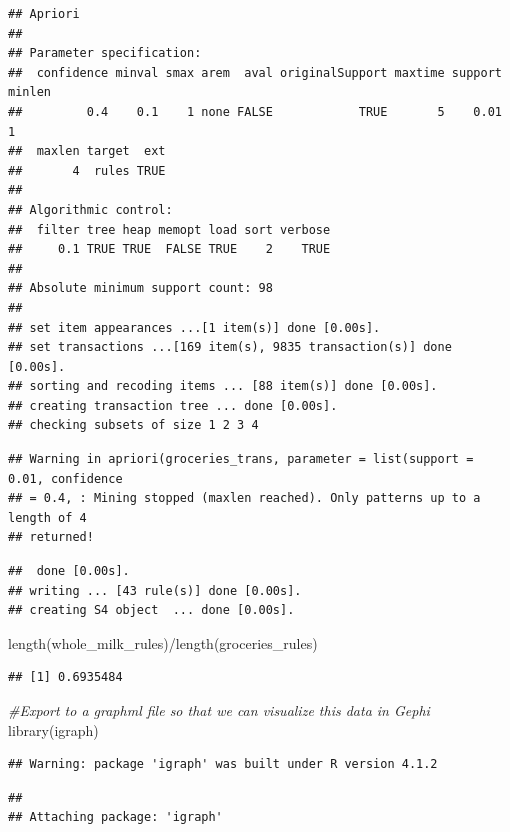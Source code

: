 \documentclass[
]{article}
\newenvironment{Shaded}{\begin{snugshade}}{\end{snugshade}}
\newcommand{\CommentTok}[1]{\textcolor[rgb]{0.56,0.35,0.01}{\textit{#1}}}
\newcommand{\FunctionTok}[1]{\textcolor[rgb]{0.00,0.00,0.00}{#1}}
\newcommand{\NormalTok}[1]{#1}
\newcommand{\SpecialCharTok}[1]{\textcolor[rgb]{0.00,0.00,0.00}{#1}}
\begin{document}
\begin{verbatim}
## Apriori
## 
## Parameter specification:
##  confidence minval smax arem  aval originalSupport maxtime support minlen
##         0.4    0.1    1 none FALSE            TRUE       5    0.01      1
##  maxlen target  ext
##       4  rules TRUE
## 
## Algorithmic control:
##  filter tree heap memopt load sort verbose
##     0.1 TRUE TRUE  FALSE TRUE    2    TRUE
## 
## Absolute minimum support count: 98 
## 
## set item appearances ...[1 item(s)] done [0.00s].
## set transactions ...[169 item(s), 9835 transaction(s)] done [0.00s].
## sorting and recoding items ... [88 item(s)] done [0.00s].
## creating transaction tree ... done [0.00s].
## checking subsets of size 1 2 3 4
\end{verbatim}

\begin{verbatim}
## Warning in apriori(groceries_trans, parameter = list(support = 0.01, confidence
## = 0.4, : Mining stopped (maxlen reached). Only patterns up to a length of 4
## returned!
\end{verbatim}

\begin{verbatim}
##  done [0.00s].
## writing ... [43 rule(s)] done [0.00s].
## creating S4 object  ... done [0.00s].
\end{verbatim}

\begin{Shaded}
\begin{Highlighting}[]
\FunctionTok{length}\NormalTok{(whole\_milk\_rules)}\SpecialCharTok{/}\FunctionTok{length}\NormalTok{(groceries\_rules)}
\end{Highlighting}
\end{Shaded}

\begin{verbatim}
## [1] 0.6935484
\end{verbatim}

\begin{Shaded}
\begin{Highlighting}[]
\CommentTok{\#Export to a graphml file so that we can visualize this data in Gephi}
\FunctionTok{library}\NormalTok{(igraph)}
\end{Highlighting}
\end{Shaded}

\begin{verbatim}
## Warning: package 'igraph' was built under R version 4.1.2
\end{verbatim}

\begin{verbatim}
## 
## Attaching package: 'igraph'
\end{verbatim}
\end{document}
